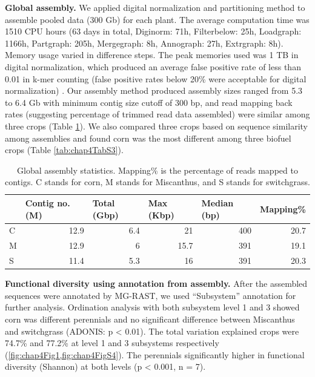 \documentclass[]{msu-thesis}
\begin{document}
\textbf{Global assembly. }
We applied digital normalization and partitioning method \cite{howe_tackling_2014} to assemble pooled data (300 Gb) for each plant. The average computation time was 1510 CPU hours (63 days in total, Diginorm: 71h, Filterbelow: 25h, Loadgraph: 1166h, Partgraph: 205h, Mergegraph: 8h, Annograph: 27h, Extrgraph: 8h). Memory usage varied in difference steps. The peak memories used was 1 TB in digital normalization, which produced an average false positive rate of less than 0.01 in k-mer counting (false positive rates below 20\% were acceptable for digital normalization) \cite{zhang_these_2014}. Our assembly method produced assembly sizes ranged from 5.3 to 6.4 Gb with minimum contig size cutoff of 300 bp, and read mapping back rates (suggesting percentage of trimmed read data assembled) were similar among three crops (Table \ref{tab:chap4TabS4}). We also compared three crops based on sequence similarity among assemblies and found corn was the most different among three biofuel crops (Table \ref{tab:chap4TabS3}).

\begin{table}[htbp]
  \centering
  \caption[Global assembly statistics]{Global assembly statistics. Mapping\% is the percentage of reads mapped to contigs. C stands for corn, M stands for Miscanthus, and S stands for switchgrass.}
    \begin{tabular}{|lrrrrr|}
    \toprule
          & \multicolumn{1}{l}{Contig no. (M)} & \multicolumn{1}{l}{Total (Gbp)} & \multicolumn{1}{l}{Max (Kbp)} & \multicolumn{1}{l}{Median (bp)} & \multicolumn{1}{l|}{Mapping\%} \\
    \midrule
    C     & 12.9  & 6.4   & 21    & 400   & 20.7 \\
    M     & 12.9  & 6     & 15.7  & 391   & 19.1 \\
    S     & 11.4  & 5.3   & 16    & 391   & 20.3 \\
    \bottomrule
    \end{tabular}%
  \label{tab:chap4TabS4}%
\end{table}%


\textbf{Functional diversity using annotation from assembly. }
After the assembled sequences were annotated by MG-RAST, we used ``Subsystem'' annotation for further analysis. Ordination analysis with both subsystem level 1 and 3 showed corn was different perennials and no significant difference between Miscanthus and switchgrass (ADONIS: p < 0.01). The total variation explained crops were 74.7\% and 77.2\% at level 1 and 3 subsystems respectively (\cref{fig:chap4Fig1,fig:chap4FigS4}). The perennials significantly higher in functional diversity (Shannon) at both levels (p < 0.001, n = 7).
\end{document}

